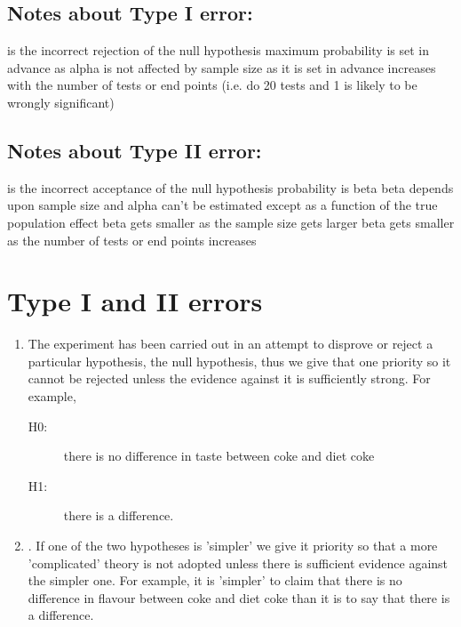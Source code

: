 \subsection{Notes about Type I error:}
is the incorrect rejection of the null hypothesis
maximum probability is set in advance as alpha
is not affected by sample size as it is set in advance
increases with the number of tests or end points (i.e. do 20 tests and 1 is likely to be wrongly significant)

\subsection{Notes about Type II error:}
is the incorrect acceptance of the null hypothesis
probability is beta
beta depends upon sample size and alpha
can't be estimated except as a function of the true population effect
beta gets smaller as the sample size gets larger
beta gets smaller as the number of tests or end points increases


\section{Type I and II errors}

\begin{enumerate}
\item The experiment has been carried out in an attempt to disprove or reject a particular hypothesis, the null hypothesis, thus we give that one priority so it cannot be rejected unless the evidence against it is sufficiently strong. For example, 

\begin{description}
\item[H0:] there is no difference in taste between coke and diet coke
\item[H1:] there is a difference.
\end{description}
\item. If one of the two hypotheses is 'simpler' we give it priority so that a more 'complicated' theory is not adopted unless there is sufficient evidence against the simpler one. For example, it is 'simpler' to claim that there is no difference in flavour between coke and diet coke than it is to say that there is a difference.
\end{enumerate}



